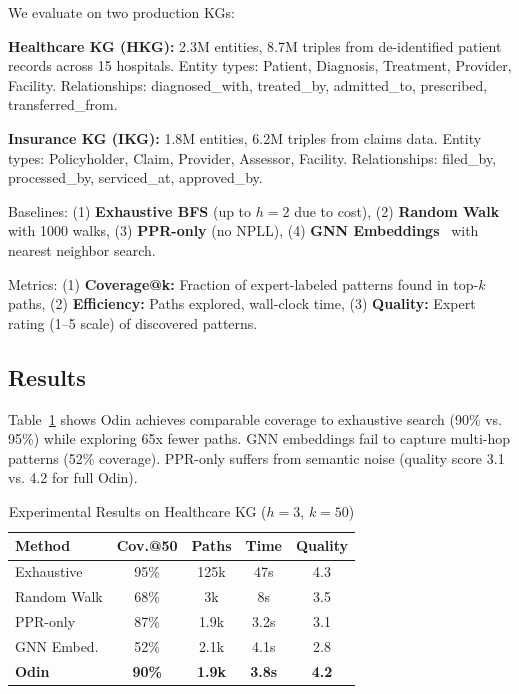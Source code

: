 \documentclass[10pt,twocolumn]{article}
\begin{document}
We evaluate on two production KGs:

\textbf{Healthcare KG (HKG):} 2.3M entities, 8.7M triples from de-identified patient records across 15 hospitals. Entity types: Patient, Diagnosis, Treatment, Provider, Facility. Relationships: diagnosed\_with, treated\_by, admitted\_to, prescribed, transferred\_from.

\textbf{Insurance KG (IKG):} 1.8M entities, 6.2M triples from claims data. Entity types: Policyholder, Claim, Provider, Assessor, Facility. Relationships: filed\_by, processed\_by, serviced\_at, approved\_by.

Baselines: (1) \textbf{Exhaustive BFS} (up to $h=2$ due to cost), (2) \textbf{Random Walk} with 1000 walks, (3) \textbf{PPR-only} (no NPLL), (4) \textbf{GNN Embeddings}~\cite{schlichtkrull2018modeling} with nearest neighbor search.

Metrics: (1) \textbf{Coverage@k:} Fraction of expert-labeled patterns found in top-$k$ paths, (2) \textbf{Efficiency:} Paths explored, wall-clock time, (3) \textbf{Quality:} Expert rating (1--5 scale) of discovered patterns.

\subsection{Results}

Table~\ref{tab:results} shows Odin achieves comparable coverage to exhaustive search (90\% vs. 95\%) while exploring 65x fewer paths. GNN embeddings fail to capture multi-hop patterns (52\% coverage). PPR-only suffers from semantic noise (quality score 3.1 vs. 4.2 for full Odin).

\begin{table}[t]
\centering
\small
\caption{Experimental Results on Healthcare KG ($h=3$, $k=50$)}
\label{tab:results}
\begin{tabular}{@{}lcccc@{}}
\toprule
\textbf{Method} & \textbf{Cov.@50} & \textbf{Paths} & \textbf{Time} & \textbf{Quality} \\ \midrule
Exhaustive & 95\% & 125k & 47s & 4.3 \\
Random Walk & 68\% & 3k & 8s & 3.5 \\
PPR-only & 87\% & 1.9k & 3.2s & 3.1 \\
GNN Embed. & 52\% & 2.1k & 4.1s & 2.8 \\
\textbf{Odin} & \textbf{90\%} & \textbf{1.9k} & \textbf{3.8s} & \textbf{4.2} \\ \bottomrule
\end{tabular}
\end{table}
\end{document}
